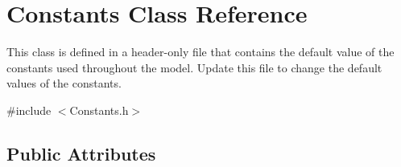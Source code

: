 \hypertarget{classConstants}{}\section{Constants Class Reference}
\label{classConstants}


This class is defined in a header-\/only file that contains the default value of the constants used throughout the model. Update this file to change the default values of the constants.  




{\ttfamily \#include $<$Constants.\+h$>$}

\subsection*{Public Attributes}
